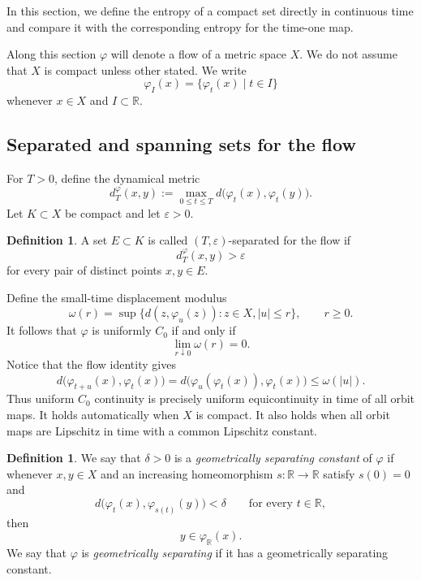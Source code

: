 \documentclass[11pt,reqno]{amsart}
\theoremstyle{definition}
\newtheorem{definition}[theorem]{Definition}
\theoremstyle{remark}
\begin{document}
\noindent
In this section, we define the entropy of
a compact set directly in continuous time and compare it with the
corresponding entropy for the time-one map.

Along this section $\varphi$ will denote a flow of a metric space $X$. We do not assume that $X$ is compact unless other stated. We write
$$
\varphi_I(x)=\{\varphi_t(x)\mid t\in I\}
$$
whenever $x\in X$ and $I\subset\mathbb{R}$.





\subsection{Separated and spanning sets for the flow}

For $T>0$, define the dynamical metric
\[
d_T^\varphi(x,y)
:=
\max_{0\leq t\leq T}
d\bigl(\varphi_t(x),\varphi_t(y)\bigr).
\]
Let $K\subset X$ be compact and let $\varepsilon>0$.

\begin{definition}
A set $E\subset K$ is called $(T,\varepsilon)$-separated for the flow
if
\[
d_T^\varphi(x,y)>\varepsilon
\]
for every pair of distinct points $x,y\in E$.
\end{definition}

Define the small-time displacement modulus
\[
 \omega(r)=\sup\bigl\{d(z,\varphi_u(z)):z\in X, |u|\le r\bigr\},
 \qquad r\ge0.
\]
It follows that $\varphi$ is uniformly $C_0$ if and only if
\[
 \lim_{r\downarrow0}\omega(r)=0.
\]
Notice that the flow identity gives
\[
 d\bigl(\varphi_{t+u}(x),\varphi_t(x)\bigr)
 =d\bigl(\varphi_u(\varphi_t(x)),\varphi_t(x)\bigr)\le \omega(|u|).
\]
Thus uniform $C_0$ continuity is precisely uniform equicontinuity in time of
all orbit maps.  It holds automatically when $X$ is compact.
It also holds
when all orbit maps are Lipschitz in time with a common Lipschitz constant.

\begin{definition}
We say that $\delta>0$ is a {\em geometrically separating constant} of $\varphi$ if whenever $x,y\in X$ and an increasing homeomorphism $s\colon\mathbb R\to\mathbb R$ satisfy
$s(0)=0$ and
    \[
    d\bigl(\varphi_t(x),\varphi_{s(t)}(y)\bigr)<\delta
    \qquad\text{for every }t\in\mathbb R,
    \]
    then
    \[
    y\in\varphi_{\mathbb R}(x).
    \]
    We say that $\varphi$ is \emph{geometrically separating} \cite{a} if it has a geometrically separating constant.
\end{definition}
\end{document}
